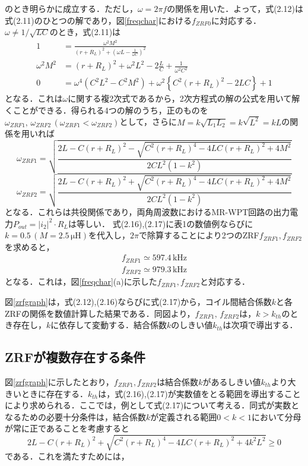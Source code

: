 のとき明らかに成立する．ただし，$\omega=2 \pi f$の関係を用いた．よって，式(2.12)は式(2.11)のひとつの解であり，図\ref{freqchar}における$f_{ZRF0}$に対応する．$\omega \neq 1/\sqrt{LC}$のとき，式(2.11)は
\begin{align}
1&=\frac{\omega^2 M^2}{(r+R_L)^2+\left(\omega L -\frac{1}{\omega C}\right)^2} \\
\omega^2 M^2 &=(r+R_L)^2+\omega^2 L^2-2\frac{L}{C}+\frac{1}{\omega^2 C^2} \\
0&=\omega^4(C^2L^2-C^2M^2)+\omega^2 \left\{C^2(r+R_L)^2-2LC\right\}+1
\end{align}
となる．これは$\omega$に関する複2次式であるから，2次方程式の解の公式を用いて解くことができる．得られる4つの解のうち，正のものを$\omega_{ZRF1}, \, \omega_{ZRF2} \, (\omega_{ZRF1}<\omega_{ZRF2})$として，さらに$M=k\sqrt{L_1L_2}=k\sqrt{L^2}=kL$の関係を用いれば
\begin{equation}
\omega_{ZRF1}
=\sqrt{\frac{2L-C(r+R_L)^2 - \sqrt{C^2(r+R_L)^4-4LC(r+R_L)^2+4M^2}}{2CL^2(1-k^2)}} 
\end{equation}
\begin{equation}
\omega_{ZRF2}
=\sqrt{\frac{2L-C(r+R_L)^2 + \sqrt{C^2(r+R_L)^4-4LC(r+R_L)^2+4M^2}}{2CL^2(1-k^2)}} 
\end{equation}
となる．これらは共役関係であり，両角周波数におけるMR-WPT回路の出力電力$P_{out}=|i_2|^2 \cdot R_L$は等しい．
式(2.16),(2.17)に表1の数値例ならびに$k=0.5\, (M=2.5 \, \mathrm{\mu H})$を代入し，$2\pi$で除算することにより2つのZRF$f_{ZRF1},f_{ZRF2}$を求めると，
\begin{align}
f_{ZRF1} \simeq 597.4 \, \mathrm{kHz} \\
f_{ZRF2} \simeq 979.3 \, \mathrm{kHz}
\end{align}
となる．これは，図\ref{freqchar}(a)に示した$f_{ZRF1},f_{ZRF2}$と対応する．\par 
図\ref{zrfgraph}は，式(2.12),(2.16)ならびに式(2.17)から，コイル間結合係数$k$と各ZRFの関係を数値計算した結果である．同図より，$f_{ZRF1}, \, f_{ZRF2}$は，$k>k_{th}$のとき存在し，$k$に依存して変動する．結合係数$k$のしきい値$k_{th}$は次項で導出する．

\subsection{ZRFが複数存在する条件}
図\ref{zrfgraph}に示したとおり，$f_{ZRF1}, f_{ZRF2}$は結合係数$k$があるしきい値$k_{th}$より大きいときに存在する．$k_{th}$は，式(2.16),(2.17)が実数値をとる範囲を導出することにより求められる．ここでは，例として式(2.17)について考える．同式が実数となるための必要十分条件は，結合係数$k$が定義される範囲$0<k<1$において分母が常に正であることを考慮すると
\begin{equation}
2L-C(r+R_L)^2 + \sqrt{C^2(r+R_L)^4-4LC(r+R_L)^2+4k^2L^2} \geq 0
\end{equation}
である．これを満たすためには，

